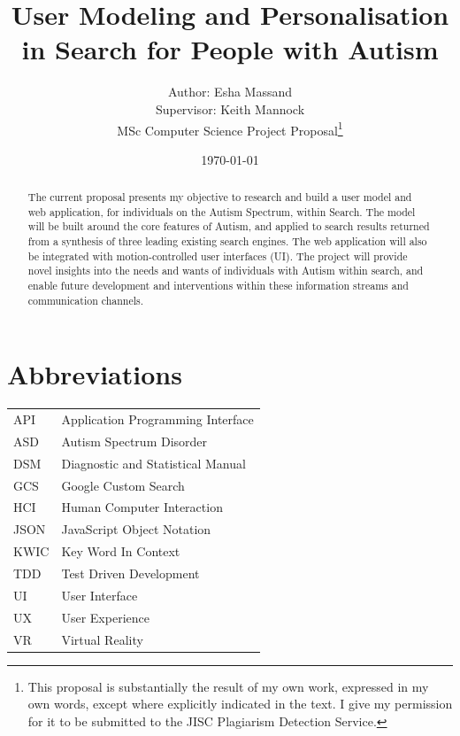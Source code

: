 \documentclass[a4paper, 10pt]{article}
\begin{document}
\title{User Modeling and Personalisation in Search for People with Autism}
\author{Author: Esha Massand\\Supervisor: Keith Mannock\\
MSc Computer Science Project Proposal\footnote{This proposal is substantially the result of my own work, expressed in my own words, except where explicitly indicated in the text. I give my permission for it to be submitted to the JISC Plagiarism Detection Service. }}
\date{\today}
\maketitle


\begin{abstract}
The current proposal presents my objective to research and build a user model and web application, for individuals on the Autism Spectrum, within Search. The model will be built around the core features of Autism, and applied to search results returned from a synthesis of three leading existing search engines. The web application will also be integrated with motion-controlled user interfaces (UI). The project will provide novel insights into the needs and wants of individuals with Autism within search, and enable future development and interventions within these information streams and communication channels.
\end{abstract}


\tableofcontents

\section*{Abbreviations}
\begin{tabular}{l l }
API & Application Programming Interface\\
ASD & Autism Spectrum Disorder\\
DSM & Diagnostic and Statistical Manual\\
GCS & Google Custom Search\\
HCI & Human Computer Interaction\\
JSON & JavaScript Object Notation\\
KWIC & Key Word In Context\\
TDD & Test Driven Development\\
UI & User Interface\\
UX & User Experience\\
VR & Virtual Reality\\
\end{tabular}
\end{document}
